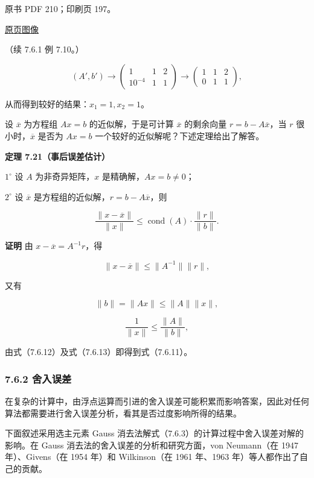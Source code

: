 \documentclass[
  10pt,
  fontset=fandol]{ctexart}
\begin{document}
\clearpage

原书 PDF 210；印刷页 197。

\href{../../../source-images/pdf-210.jpeg}{原页图像}

（续 7.6.1 例 7.10。）

\[
(A',b')\longrightarrow
\left(\begin{array}{cc|c}1&1&2\\10^{-4}&1&1\end{array}\right)
\longrightarrow
\left(\begin{array}{cc|c}1&1&2\\0&1&1\end{array}\right),
\]

从而得到较好的结果：\(x_1=1,x_2=1\)。

设 \(\overline x\) 为方程组 \(Ax=b\) 的近似解，于是可计算
\(\overline x\) 的剩余向量 \(r=b-A\overline x\)，当 \(r\)
很小时，\(\overline x\) 是否为 \(Ax=b\)
一个较好的近似解呢？下述定理给出了解答。

\textbf{定理 7.21（事后误差估计）}

\(1^\circ\) 设 \(A\) 为非奇异矩阵，\(x\) 是精确解，\(Ax=b\neq0\)；

\(2^\circ\) 设 \(\overline x\)
是方程组的近似解，\(r=b-A\overline x\)，则

\[
\frac{\|x-\overline x\|}{\|x\|}\leqslant\operatorname{cond}(A)\cdot\frac{\|r\|}{\|b\|}.
\tag{7.6.11}
\]

\textbf{证明} 由 \(x-\overline x=A^{-1}r\)，得

\[
\|x-\overline x\|\leqslant\|A^{-1}\|\|r\|,
\tag{7.6.12}
\]

又有

\[
\|b\|=\|Ax\|\leqslant\|A\|\|x\|,
\]

\[
\frac1{\|x\|}\leqslant\frac{\|A\|}{\|b\|},
\tag{7.6.13}
\]

由式（7.6.12）及式（7.6.13）即得到式（7.6.11）。

\subsubsection{7.6.2 舍入误差}\label{ux820dux5165ux8befux5dee}

在复杂的计算中，由浮点运算而引进的舍入误差可能积累而影响答案，因此对任何算法都需要进行舍入误差分析，看其是否过度影响所得的结果。

下面叙述采用选主元素 Gauss
消去法解式（7.6.3）的计算过程中舍入误差对解的影响。在 Gauss
消去法的舍入误差的分析和研究方面，von Neumann（在 1947 年）、Givens（在
1954 年）和 Wilkinson（在 1961 年、1963 年）等人都作出了自己的贡献。
\end{document}
